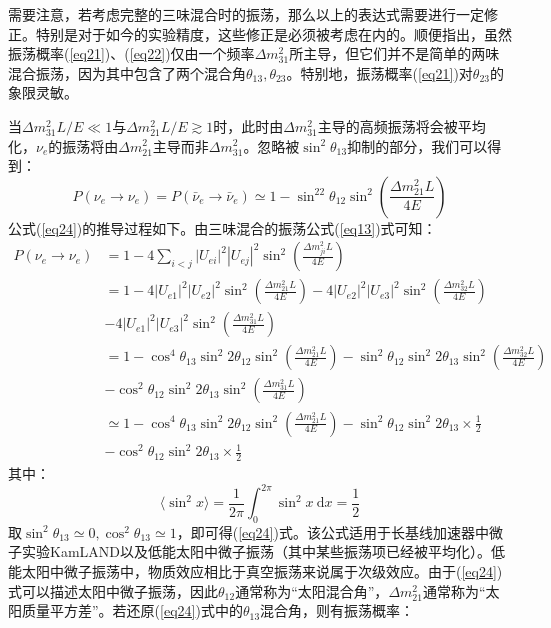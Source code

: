 \documentclass{article}
\newcommand{\dd}{\mathrm{d}}
\begin{document}
		需要注意，若考虑完整的三味混合时的振荡，那么以上的表达式需要进行一定修正。特别是对于如今的实验精度，这些修正是必须被考虑在内的。顺便指出，虽然振荡概率(\ref{eq21})、(\ref{eq22})仅由一个频率$\Delta m_{31}^2$所主导，但它们并不是简单的两味混合振荡，因为其中包含了两个混合角$\theta_{13},\theta_{23}$。特别地，振荡概率(\ref{eq21})对$\theta_{23}$的象限灵敏。
		
		当$\Delta m_{31}^2L/E\ll1$与$\Delta m_{21}^2L/E\gtrsim1$时，此时由$\Delta m_{31}^2$主导的高频振荡将会被平均化，$\nu_e$的振荡将由$\Delta m_{21}^2$主导而非$\Delta m_{31}^2$。忽略被$\sin^2\theta_{13}$抑制的部分，我们可以得到：
		\begin{equation}
			P(\nu_e\to\nu_e)=P(\bar{\nu}_e\to\bar{\nu}_e)\simeq1-\sin^22\theta_{12}\sin^2\left(\frac{\Delta m_{21}^2L}{4E}\right)
			\label{eq24}
		\end{equation}
		公式(\ref{eq24})的推导过程如下。由三味混合的振荡公式(\ref{eq13})式可知：
		\begin{equation*}
			\begin{aligned}
				P(\nu_e\to\nu_e)&=1-4\sum_{i<j}|U_{ei}|^2|U_{ej}|^2\sin^2\left(\frac{\Delta m_{ji}^2L}{4E}\right)\\
				&=1-4|U_{e1}|^2|U_{e2}|^2\sin^2\left(\frac{\Delta m_{21}^2L}{4E}\right)-4|U_{e2}|^2|U_{e3}|^2\sin^2\left(\frac{\Delta m_{32}^2L}{4E}\right)\\
				&-4|U_{e1}|^2|U_{e3}|^2\sin^2\left(\frac{\Delta m_{31}^2L}{4E}\right)\\
				&=1-\cos^{4}\theta_{13}\sin^{2}2\theta_{12}\sin^2\left(\frac{\Delta m_{21}^2L}{4E}\right)-\sin^{2}\theta_{12}\sin^{2}2\theta_{13}\sin^2\left(\frac{\Delta m_{32}^2L}{4E}\right)\\&-\cos^{2}\theta_{12}\sin^{2}2\theta_{13}\sin^2\left(\frac{\Delta m_{31}^2L}{4E}\right)\\
				&\simeq 1-\cos^{4}\theta_{13}\sin^{2}2\theta_{12}\sin^2\left(\frac{\Delta m_{21}^2L}{4E}\right)-\sin^{2}\theta_{12}\sin^{2}2\theta_{13}\times\frac{1}{2}\\&-\cos^{2}\theta_{12}\sin^{2}2\theta_{13}\times\frac{1}{2}
				\end{aligned}
		\end{equation*}
		其中：
		\begin{equation*}
			\langle\sin^2x\rangle=\frac{1}{2\pi}\int_0^{2\pi}\sin^2x\ \dd x=\frac{1}{2}
		\end{equation*}
		取$\sin^2\theta_{13}\simeq0,\cos^2\theta_{13}\simeq1$，即可得(\ref{eq24})式。该公式适用于长基线加速器中微子实验KamLAND以及低能太阳中微子振荡（其中某些振荡项已经被平均化）。低能太阳中微子振荡中，物质效应相比于真空振荡来说属于次级效应。由于(\ref{eq24})式可以描述太阳中微子振荡，因此$\theta_{12}$通常称为“太阳混合角”，$\Delta m_{21}^2$通常称为“太阳质量平方差”。若还原(\ref{eq24})式中的$\theta_{13}$混合角，则有振荡概率：
\end{document}
